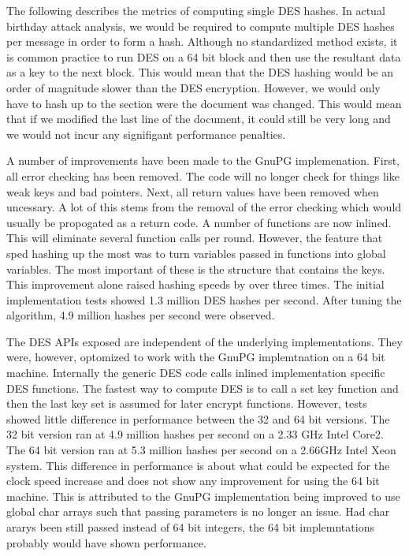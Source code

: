 The following describes the metrics of computing single DES hashes.
In actual birthday attack analysis, we would be required to compute
multiple DES hashes per message in order to form a hash.  Although
no standardized method exists, it is common practice to run DES
on a 64 bit block and then use the resultant data as a key to the
next block.  This would mean that the DES hashing would be an order 
of magnitude slower than the DES encryption.  However, we would
only have to hash up to the section were the document was changed.
This would mean that if we modified the last line of the document,
it could still be very long and we would not incur any signifigant
performance penalties. 

A number of improvements have been made to the GnuPG implemenation.
First, all error checking has been removed.  The code will no longer
check for things like weak keys and bad pointers.  Next, all return
values have been removed when uncessary.  A lot of this stems from the
removal of the error checking which would usually be propogated as a
return code.  A number of functions are now inlined.  This will eliminate
several function calls per round.  However, the feature that sped hashing
up the most was to turn variables passed in functions into global variables.
The most important of these is the structure that contains the keys.
This improvement alone raised hashing speeds by over three times.
The initial implementation tests showed 1.3 million DES hashes per second.
After tuning the algorithm, 4.9 million hashes per second were observed.

The DES APIs exposed are independent of the underlying implementations.
They were, however, optomized to work with the GnuPG implemtnation on
a 64 bit machine.  Internally the generic DES code calls inlined
implementation specific DES functions.  The fastest way to compute DES
is to call a set key function and then the last key set is assumed for 
later encrypt functions. However, tests showed little difference in performance
between the 32 and 64 bit versions.  The 32 bit version ran at 4.9 million
hashes per second on a 2.33 GHz Intel Core2.  The 64 bit version ran at
5.3 million hashes per second on a 2.66GHz Intel Xeon system.  This
difference in performance is about what could be expected for the 
clock speed increase and does not show any improvement for using the 
64 bit machine.  This is attributed to the GnuPG implementation being
improved to use global char arrays such that passing parameters is no
longer an issue.  Had char ararys been still passed instead of 64 bit
integers, the 64 bit implemntations probably would have shown performance.

